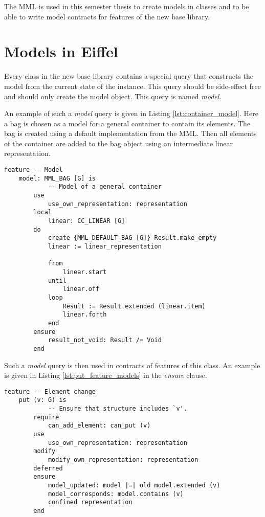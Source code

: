 The MML is used in this semester thesis to create models in classes and to be able to write model contracts for features of the new base library.

\section{Models in Eiffel}
\label{sec:ModelsInEiffel}

Every class in the new base library contains a special query that constructs the model from the current state of the instance. This query should be side-effect free and should only create the model object. This query is named \emph{model}.

An example of such a \emph{model} query is given in Listing \ref{lst:container_model}. Here a bag is chosen as a model for a general container to contain its elements. The bag is created using a default implementation from the MML. Then all elements of the container are added to the bag object using an intermediate linear representation.

\begin{lstlisting}[float,caption=model feature of the CC\_CONTAINER class.,label=lst:container_model]
feature -- Model
	model: MML_BAG [G] is
			-- Model of a general container
		use
			use_own_representation: representation
		local
			linear: CC_LINEAR [G]
		do
			create {MML_DEFAULT_BAG [G]} Result.make_empty
			linear := linear_representation

			from
				linear.start
			until
				linear.off
			loop
				Result := Result.extended (linear.item)
				linear.forth
			end
		ensure
			result_not_void: Result /= Void
		end
\end{lstlisting}

Such a \emph{model} query is then used in contracts of features of this class. An example is given in Listing \ref{lst:put_feature_models} in the \emph{ensure} clause. 

\begin{lstlisting}[float,caption=put feature of the CC\_COLLECTION class.,label=lst:put_feature_models]
feature -- Element change
	put (v: G) is
			-- Ensure that structure includes `v'.
		require
			can_add_element: can_put (v)
		use
			use_own_representation: representation
		modify
			modify_own_representation: representation
		deferred
		ensure
			model_updated: model |=| old model.extended (v)
			model_corresponds: model.contains (v)
			confined representation
		end
\end{lstlisting}

